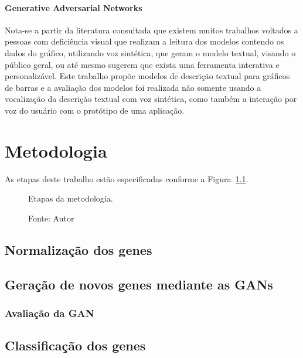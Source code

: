 \documentclass[
	12pt,				%
	openright,			%
	oneside,			%
	a4paper,			%
	english,			%
	brazil				%
	]{abntex2}
\begin{document}
\subsubsection{Generative Adversarial Networks}




Nota-se a partir da literatura consultada que existem muitos trabalhos voltados a pessoas com deficiência visual que realizam a leitura dos modelos contendo os dados do gráfico, utilizando voz sintética, que geram o modelo textual, visando o público geral, ou até mesmo sugerem que exista uma ferramenta interativa e personalizável. Este trabalho propõe modelos de descrição textual para gráficos de barras e a avaliação dos modelos foi realizada não somente usando a vocalização da descrição textual com voz sintética, como também a interação por voz do usuário com o protótipo de uma aplicação.

\chapter{Metodologia}

As etapas deste trabalho estão especificadas conforme a Figura~\ref{fig:metodologia}.

\begin{figure}[!h]
\caption{Etapas da metodologia.}
\caption*{Fonte: Autor}
\label{fig:metodologia}
\end{figure}

\section{Normalização dos genes}

\section{Geração de novos genes mediante as GANs}





\subsection{Avaliação da GAN}

\section{Classificação dos genes}
\end{document}
